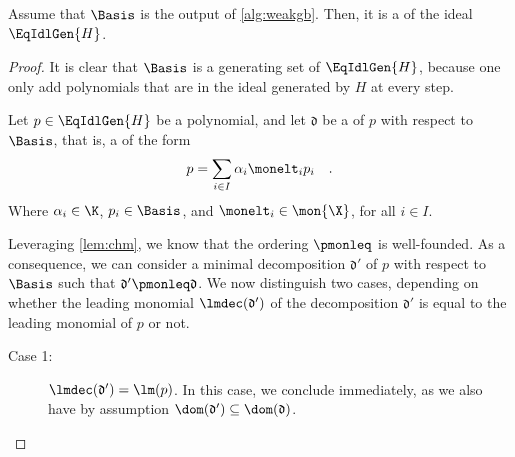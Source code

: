 \begin{lemma}
  \label{lem:weakgb-correctness}
  Assume that $\Basis$ is the output of \cref{alg:weakgb}. Then, it 
  is a  of the ideal
  $\EqIdlGen{H}$.
\end{lemma}
\begin{proof}
  It is clear that $\Basis$ is a generating set of $\EqIdlGen{H}$, because
  one only add polynomials that are in the ideal generated by $H$ at every step.

  Let $p \in \EqIdlGen{H}$ be a polynomial,
  and let $\mathfrak{d}$ be a  of $p$ with respect to
  $\Basis$, that is, a  of the form
  \begin{equation}
    p = \sum_{i \in I} \alpha_i \monelt_i p_i
    \quad .
  \end{equation}
  Where $\alpha_i \in \K$, $p_i \in \Basis$, and $\monelt_i \in \mon{\X}$,
  for all $i \in I$.

  Leveraging \cref{lem:chm}, we know that the ordering $\pmonleq$ is
  well-founded. As a consequence, we can consider a minimal 
  decomposition $\mathfrak{d}'$ of $p$ with respect to $\Basis$ such that $\mathfrak{d}'
  \pmonleq \mathfrak{d}$. We now distinguish two cases, depending on whether
  the leading monomial $\lmdec(\mathfrak{d}')$ of the decomposition $\mathfrak{d}'$ is
  equal to the leading monomial of $p$ or not.

  \begin{description}
    \item[Case 1:] $\lmdec(\mathfrak{d}') = \lm(p)$.
      In this case, we conclude immediately,
      as we also have by assumption $\dom(\mathfrak{d}') \subseteq \dom(\mathfrak{d})$.


\end{description}
\end{proof}
